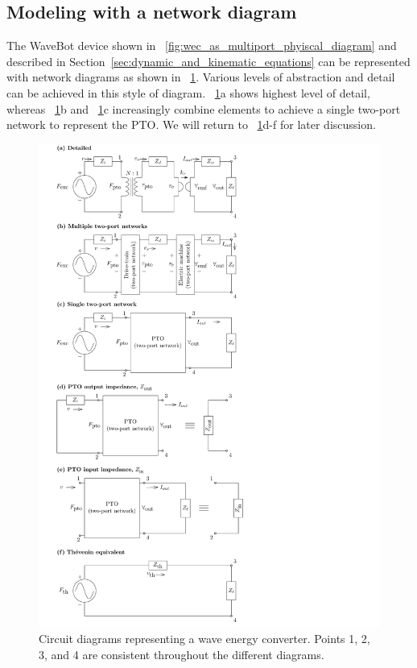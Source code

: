 \documentclass[lettersize,journal]{IEEEtran}
\begin{document}
\subsection{Modeling with a network diagram}\label{sec:modeling_with_a_network_diagram}

The WaveBot device shown in \figurename~\ref{fig:wec_as_multiport_phyiscal_diagram} and described in Section~\ref{sec:dynamic_and_kinematic_equations} can be represented with network diagrams as shown in \figurename~\ref{fig:wec_as_multiport_circuits}.
Various levels of abstraction and detail can be achieved in this style of diagram.
\figurename~\ref{fig:wec_as_multiport_circuits}a shows highest level of detail, whereas \figurename~\ref{fig:wec_as_multiport_circuits}b and \figurename~\ref{fig:wec_as_multiport_circuits}c increasingly combine elements to achieve a single two-port network to represent the PTO.
We will return to \figurename~\ref{fig:wec_as_multiport_circuits}d-f for later discussion.

\begin{figure}[tb]
        \centering
        \includegraphics[width=1\columnwidth]{wec_as_multiport_circuits.pdf}
        \caption{Circuit diagrams representing a wave energy converter. Points 1, 2, 3, and 4 are consistent throughout the different diagrams.}
        \label{fig:wec_as_multiport_circuits}
\end{figure}
\end{document}
